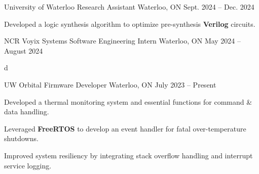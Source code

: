 
\begin{cventries}
 \cventry
    {University of Waterloo} %
    {Research Assistant} %
    {Waterloo, ON} %
    {Sept. 2024 -- Dec. 2024} %
    {
        \begin{cvitems} %
            \item {Developed a logic synthesis algorithm to optimize pre-synthesis \textbf{Verilog} circuits.} %
            \end{cvitems}
    }

        
 \cventry
    {NCR Voyix} %
    {Systems Software Engineering Intern} %
    {Waterloo, ON} %
    {May 2024 -- August 2024} %
    {
        \begin{cvitems}
            \item {d}
        \end{cvitems}
    }
    
 \cventry
    {UW Orbital} %
    {Firmware Developer} %
    {Waterloo, ON} %
    {July 2023 -- Present} %
    {
      \begin{cvitems} %
        \item {Developed a thermal monitoring system and essential functions for command \& data handling.}
	  \item {Leveraged \textbf{FreeRTOS} to develop an event handler for fatal over-temperature shutdowns.}
        \item {Improved system resiliency by integrating stack overflow handling and interrupt service logging.}
      \end{cvitems}
    }
    
\end{cventries}
